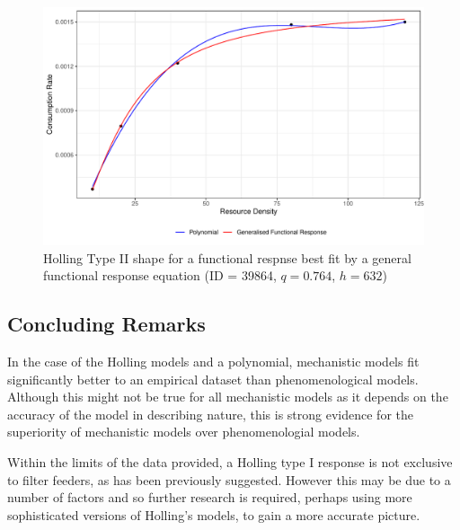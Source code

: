 \documentclass[11pt, a4paper, titlepage]{article}
\begin{document}
\begin{figure}[ht!]
	\centering\includegraphics[width=1\textwidth]{../Results/GFR_Holling2_example.pdf}
	\caption{Holling Type II shape for a functional respnse best fit by a general functional response equation (ID = 39864, $q = 0.764$, $h = 632$)}
\end{figure}

\subsection{Concluding Remarks}

In the case of the Holling models and a polynomial, mechanistic models fit significantly better to an empirical dataset than phenomenological models. Although this might not be true for all mechanistic models as it depends on the accuracy of the model in describing nature, this is strong evidence for the superiority of mechanistic models over phenomenologial models.

Within the limits of the data provided, a Holling type I response is not exclusive to filter feeders, as has been previously suggested. However this may be due to a number of factors and so further research is required, perhaps using more sophisticated versions of Holling's models, to gain a more accurate picture.


\newpage
\printbibliography
\end{document}
